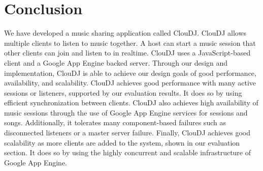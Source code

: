 \section{Conclusion}
    \label{sec:conc}
We have developed a music sharing application called ClouDJ.
ClouDJ allows multiple clients to listen to music together. A host can start
a music session that other clients can join and listen to in
realtime. ClouDJ uses a JavaScript-based client and a Google App Engine
backed server. Through our design and implementation, ClouDJ
is able to achieve our design goals of good performance, availability, and scalability.
ClouDJ achieves good performance with many active sessions
or listeners, supported by our evaluation results. It does so by using efficient synchronization between clients.
ClouDJ also achieves high availability of music sessions through the use of Google App Engine
services for sessions and songs. Additionally, it tolerates many
component-based failures such as disconnected listeners or a master server failure.
Finally, ClouDJ achieves good scalability as more clients are added to the system,
shown in our evaluation section. It does so by using the highly concurrent and scalable infrastructure
of Google App Engine.